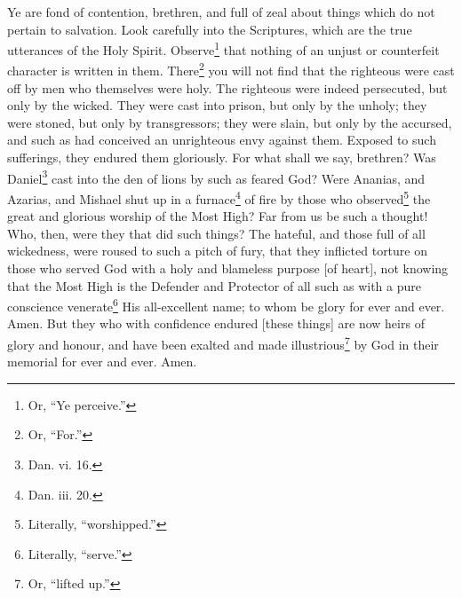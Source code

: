 Ye are fond of contention, brethren, and full of zeal about things which do not pertain to salvation. Look carefully into the Scriptures, which are the true utterances of the Holy Spirit. Observe\footnote{Or, “Ye perceive.”} that nothing of an unjust or counterfeit character is written in them. There\footnote{Or, “For.”} you will not find that the righteous were cast off by men who themselves were holy. The righteous were indeed persecuted, but only by the wicked. They were cast into prison, but only by the unholy; they were stoned, but only by transgressors; they were slain, but only by the accursed, and such as had conceived an unrighteous envy against them. Exposed to such sufferings, they endured them gloriously. For what shall we say, brethren? Was Daniel\footnote{Dan. vi. 16.} cast into the den of lions by such as feared God? Were Ananias, and Azarias, and Mishael shut up in a furnace\footnote{Dan. iii. 20.} of fire by those who observed\footnote{Literally, “worshipped.”} the great and glorious worship of the Most High? Far from us be such a thought! Who, then, were they that did such things? The hateful, and those full of all wickedness, were roused to such a pitch of fury, that they inflicted torture on those who served God with a holy and blameless purpose [of heart], not knowing that the Most High is the Defender and Protector of all such as with a pure conscience venerate\footnote{Literally, “serve.”} His all-excellent name; to whom be glory for ever and ever. Amen. But they who with confidence endured [these things] are now heirs of glory and honour, and have been exalted and made illustrious\footnote{Or, “lifted up.”} by God in their memorial for ever and ever. Amen.


